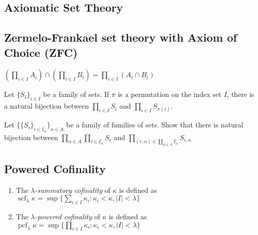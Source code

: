 \documentclass{treatise}
\begin{document}
\begin{shaded}
\chapter{Axiomatic Set Theory}
\section{Zermelo-Frankael set theory with Axiom of Choice (ZFC)}
\begin{proposition}
$\left(\prod_{i \in I} A_i \right) \cap \left( \prod_{i \in I} B_i \right) = \prod_{i \in I} (A_i \cap B_i)$
\end{proposition}
\begin{proposition}
Let $\{ S_i \}_{i \in I}$ be a family of sets. If $\pi$ is a permutation on the index set $I$, there is a natural bijection  between $\prod_{i \in I} S_i$ and $\prod_{i \in I} S_{\pi(i)}$.
\end{proposition}
\begin{proposition}
Let $\{ \{ S_i \}_{i \in I_\alpha} \}_{\alpha \in A}$ be a family of families of sets. Show that there is natural bijection between $\prod_{\alpha \in A} \prod_{i \in I_\alpha} S_i$ and $\prod_{(i, \alpha) \in \coprod_{\alpha \in A} I_\alpha} S_{i, \alpha}$
\end{proposition}

\section{Powered Cofinality}
\begin{enumerate}
	\item The \emph{$\lambda$-summatory cofinality} of $\kappa$ is defined as $\operatorname{scf}_\lambda \kappa = \sup \{ \sum_{i \in I} \kappa_i : \kappa_i < \kappa, |I| < \lambda \}$
	\item The \emph{$\lambda$-powered cofinality} of $\kappa$ is defined as $\operatorname{pcf}_\lambda \kappa = \sup \{ \prod_{i \in I} \kappa_i : \kappa_i < \kappa, |I| < \lambda \}$
\end{enumerate}


\end{shaded}
\end{document}
